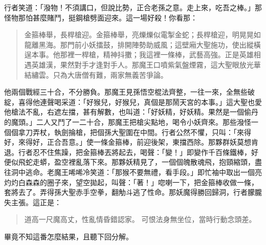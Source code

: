 行者笑道：「潑物！不須講口，但說比勢，正合老孫之意。走上來，吃吾之棒。」那怪物那怕甚麼賭鬥，挺鋼槍劈面迎來。這一場好殺！你看那：
\begin{quote}
金箍棒舉，長桿槍迎。金箍棒舉，亮爍爍似電掣金蛇；長桿槍迎，明晃晃如龍離黑海。那門前小妖擂鼓，排開陣勢助威風；這壁廂大聖施功，使出縱橫逞本事。他那裡一桿槍，精神抖擻；我這裡一條棒，武藝高強。正是英雄相遇英雄漢，果然對手才逢對手人。那魔王口噴紫氣盤煙霧，這大聖眼放光華結繡雲。只為大唐僧有難，兩家無義苦爭論。
\end{quote}

他兩個戰經三十合，不分勝負。那魔王見孫悟空棍法齊整，一往一來，全無些破綻，喜得他連聲喝采道：「好猴兒，好猴兒，真個是那鬧天宮的本事。」這大聖也愛他槍法不亂，右遮左擋，甚有解數，也叫道：「好妖精，好妖精。果然是一個偷丹的魔頭。」二人又鬥了一二十合，那魔王把槍尖點地，喝令小妖齊來。那些潑怪一個個拿刀弄杖，執劍掄槍，把個孫大聖圍在中間。行者公然不懼，只叫：「來得好，來得好，正合吾意。」使一條金箍棒，前迎後架，東擋西除。那夥群妖莫想肯退。行者忍不住焦躁，把金箍棒丟將起去，喝聲：「變！」即變作千百條鐵棒，好便似飛蛇走蟒，盈空裡亂落下來。那夥妖精見了，一個個魄散魂飛，抱頸縮頭，盡往洞中逃命。老魔王唏唏冷笑道：「那猴不要無禮，看手段。」即忙袖中取出一個亮灼灼白森森的圈子來，望空拋起，叫聲：「著！」唿喇一下，把金箍棒收做一條，套將去了。弄得孫大聖赤手空拳，翻觔斗逃了性命。那妖魔得勝回歸洞，行者朦朧失主張。這正是：
\begin{quote}
道高一尺魔高丈，性亂情昏錯認家。
可恨法身無坐位，當時行動念頭差。
\end{quote}

畢竟不知這番怎麼結果，且聽下回分解。
